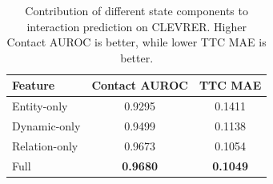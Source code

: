 \begin{table}[t]
\centering
\caption{Contribution of different state components to interaction prediction on CLEVRER. Higher Contact AUROC is better, while lower TTC MAE is better.}
\label{tab:relation-component-control}
\small
\setlength{\tabcolsep}{8pt}
\renewcommand{\arraystretch}{1.05}
\begin{tabular}{@{}lcc@{}}
\toprule
\textbf{Feature} & \textbf{Contact AUROC} & \textbf{TTC MAE} \\
\midrule
Entity-only   & 0.9295 & 0.1411 \\
Dynamic-only  & 0.9499 & 0.1138 \\
Relation-only & 0.9673 & 0.1054 \\
Full          & \textbf{0.9680} & \textbf{0.1049} \\
\bottomrule
\end{tabular}
\end{table}